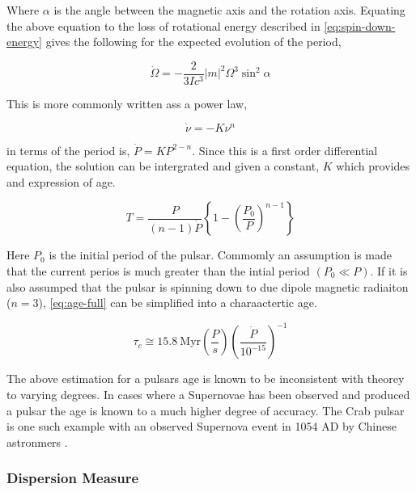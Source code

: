 Where $\alpha$ is the angle between the magnetic axis and the rotation axis. Equating the above equation to the loss of rotational energy described in \cref{eq:spin-down-energy} gives the following for the expected evolution of the period, 

\begin{equation}
    \dot \Omega = - \frac{2}{3Ic^3} |m|^2 \Omega^3 \sin^2 \alpha
\end{equation}

This is more commonly written ass a power law, 

\begin{equation}
    \dot \nu = -K \nu^n 
    \label{eq:spin-down-power-law}
\end{equation}

 in terms of the period is, $\dot P = K P^{2-n}$. Since this is a first order differential equation, the solution can be intergrated and given a constant, $K$ which provides and expression of age. 

\begin{equation}
    T = \frac{P}{(n-1)\dot P} \left\{ 1 - \left( \frac{P_0}{P} \right)^{n - 1} \right\} 
    \label{eq:age-full}
\end{equation}

Here $P_0$ is the initial period of the pulsar. Commomly an assumption is made that the current perios is much greater than the intial period $(P_0 \ll P)$. If it is also assumped that the pulsar is spinning down to due dipole magnetic radiaiton ($n=3$), \cref{eq:age-full} can be simplified into a charaactertic age. 

\begin{equation}
    \tau_c \cong 15.8~\text{Myr} \left( \frac{P}{s} \right) \left( \frac{\dot P}{10^{-15}} \right)^{-1}
\end{equation}

The above estimation for a pulsars age is known to be inconsistent with theorey to varying degrees. In cases where a Supernovae has been observed and produced a pulsar the age is known to a much higher degree of accuracy. The Crab pulsar is one such example with an observed Supernova event in 1054 AD by Chinese astronmers \citep{kaspi_chandra_2001}. %

\subsubsection{Dispersion Measure}

